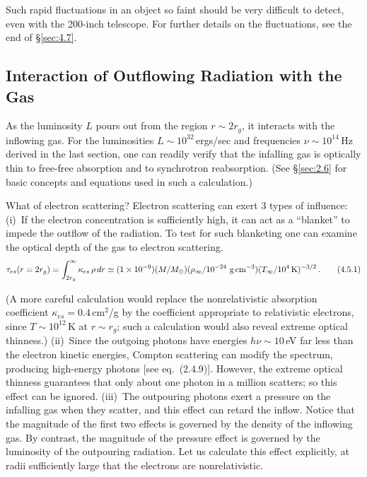 Such rapid fluctuations in an object so faint should be very difficult to detect,
even with the 200-inch telescope.  For further details on the fluctuations, see
the end of \S\ref{sec:4.7}.


\subsection{Interaction of Outflowing Radiation with the Gas}
\label{sec:4.5}

As the luminosity $L$ pours out from the region $r \sim 2r_g$, it interacts with the
inflowing gas.  For the luminosities $L \sim 10^{32}$\,ergs/sec and frequencies $\nu \sim 10^{14}$\,Hz
derived in the last section, one can readily verify that the infalling gas is optically
thin to free-free absorption and to synchrotron reabsorption.  (See \S\ref{sec:2.6} for
basic concepts and equations used in such a calculation.)

What of electron scattering?  Electron scattering can exert 3 types of influence:
(i)~If the electron concentration is sufficiently high, it can act as a ``blanket'' to
impede the outflow of the radiation.  To test for such blanketing one can examine
the optical depth of the gas to electron scattering.
%
\begin{equation}
\tau_{es}(r = 2r_g)
= \int_{2r_g}^{\infty}\kappa_{es}\,\rho\, dr
\simeq (1 \times 10^{-9})(M/M_\odot)
  (\rho_\infty / 10^{-24}~\text{g\,cm}^{-3})
  (T_\infty / 10^4\,\text{K})^{-3/2}\,.
\tag{4.5.1}
\end{equation}

(A more careful calculation would replace the nonrelativistic absorption
coefficient $\kappa_{es} = 0.4$\,cm$^2$/g by the coefficient appropriate to relativistic
electrons, since $T \sim 10^{12}$\,K at $r \sim r_g$; such a calculation would also reveal
extreme optical thinness.)  (ii)~Since the outgoing photons have energies
$h\nu \sim 10$\,eV far less than the electron kinetic energies, Compton scattering can
modify the spectrum, producing high-energy photons [see eq.~(2.4.9)].  However,
the extreme optical thinness guarantees that only about one photon in a million
scatters; so this effect can be ignored.  (iii)~The outpouring photons exert a
pressure on the infalling gas when they scatter, and this effect can retard the
inflow.  Notice that the magnitude of the first two effects is governed by the
density of the inflowing gas.  By contrast, the magnitude of the pressure effect
is governed by the luminosity of the outpouring radiation.  Let us calculate this
effect explicitly, at radii sufficiently large that the electrons are nonrelativistic.

